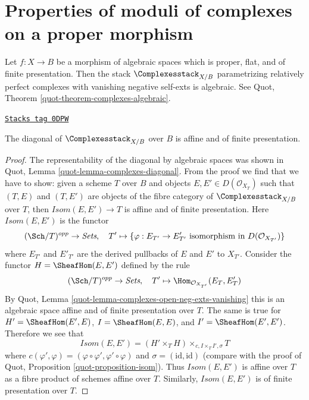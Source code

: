 \section{Properties of moduli of complexes on a proper morphism}
\label{moduli-section-complexes}
Let $f : X \to B$ be a morphism of algebraic spaces which is proper,
flat, and of finite presentation. Then the stack
$\Complexesstack_{X/B}$ parametrizing relatively perfect complexes
with vanishing negative self-exts is algebraic. See
Quot, Theorem \ref{quot-theorem-complexes-algebraic}.

\begin{lemma}
\label{moduli-lemma-complexes-diagonal-affine-fp}
\href{https://stacks.math.columbia.edu/tag/0DPW}{\texttt{Stacks tag 0DPW}}

The diagonal of $\Complexesstack_{X/B}$ over $B$ is affine
and of finite presentation.
\end{lemma}

\begin{proof}
The representability of the diagonal by algebraic spaces
was shown in Quot, Lemma \ref{quot-lemma-complexes-diagonal}.
From the proof we find that we have to show:
given a scheme $T$ over $B$ and objects
$E, E' \in D(\mathcal{O}_{X_T})$ such that
$(T, E)$ and $(T, E')$ are objects of the fibre category
of $\Complexesstack_{X/B}$ over $T$, then
$\mathit{Isom}(E, E') \to T$
is affine and of finite presentation.
Here $\mathit{Isom}(E, E')$ is the functor
$$
(\Sch/T)^{opp} \to \textit{Sets},\quad
T' \mapsto \{\varphi : E_{T'} \to E'_{T'}
\text{ isomorphism in }D(\mathcal{O}_{X_{T'}})\}
$$
where $E_{T'}$ and $E'_{T'}$ are the derived pullbacks of $E$ and $E'$
to $X_{T'}$. Consider the functor $H = \SheafHom(E, E')$ defined
by the rule
$$
(\Sch/T)^{opp} \to \textit{Sets},\quad
T' \mapsto \Hom_{\mathcal{O}_{X_{T'}}}(E_T, E'_T)
$$
By Quot, Lemma \ref{quot-lemma-complexes-open-neg-exts-vanishing}
this is an algebraic space affine and of finite presentation over $T$.
The same is true for $H' = \SheafHom(E', E)$, $I = \SheafHom(E, E)$, and
$I' = \SheafHom(E', E')$. Therefore we see that
$$
\mathit{Isom}(E, E') = (H' \times_T H) \times_{c, I \times_T I', \sigma} T
$$
where $c(\varphi', \varphi) = (\varphi \circ \varphi', \varphi' \circ \varphi)$
and $\sigma = (\text{id}, \text{id})$ (compare with the proof of
Quot, Proposition \ref{quot-proposition-isom}). Thus
$\mathit{Isom}(E, E')$ is affine over $T$ as a fibre product of
schemes affine over $T$. Similarly, $\mathit{Isom}(E, E')$ is
of finite presentation over $T$.
\end{proof}

